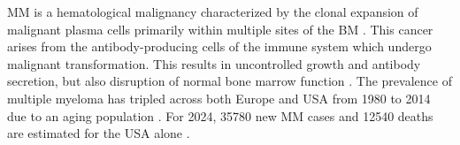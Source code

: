





%
\label{sec:intro_myeloma}%
\ac{MM} is a hematological malignancy characterized by the clonal expansion of
malignant plasma cells primarily within multiple sites of the \ac{BM}
\cite{yangPathogenesisTreatmentMultiple2022}. This cancer arises from the
antibody-producing cells of the immune system  which
undergo malignant transformation. This results in uncontrolled growth and
antibody secretion, but also disruption of normal bone marrow function
. The prevalence of
multiple myeloma has tripled across both Europe and USA from 1980 to 2014 due to
an aging population \cite{ociasTrendsHematologicalCancer2016,
    turessonRapidlyChangingMyeloma2018}. For 2024, 35780 new \ac{MM} cases and 12540
deaths are estimated for the USA alone \cite{siegelCancerStatistics20242024}.

